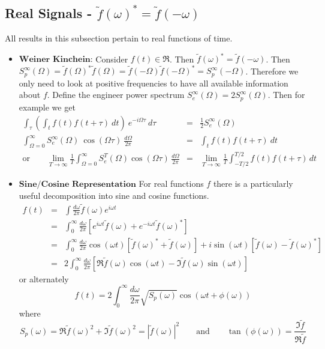 \documentclass{article}
\begin{document}
\subsection*{Real Signals - $\tilde{f}(\omega)^{*}=\tilde{f}(-\omega)$}
All results in this subsection pertain to real functions of time.

\begin{itemize}

\item $\textbf{Weiner Kinchein:}$ Consider $f(t)\in\Re$. Then $\tilde{f}(\omega)^{*}=\tilde{f}(-\omega)$.
Then $S_{p}^{\infty}(\Omega)=\tilde{f}(\Omega)^{*}\tilde{f}(\Omega)=\tilde{f}(-\Omega)\tilde{f}(-\Omega)^{*}=S_{p}^{\infty}(-\Omega)$.
Therefore we only need to look at positive frequencies to have all
available information about $f$. Define the engineer power spectrum
$S_{e}^{\infty}(\Omega)=2S_{p}^{\infty}(\Omega)$. Then for example
we get \begin{eqnarray*}
\int_{\tau}\left(\int_{t}f(t)f(t+\tau)~dt\right)\: e^{-i\Omega\tau}\: d\tau & = & \frac{1}{2}S_{e}^{\infty}(\Omega)\\
\int_{\Omega=0}^{\infty}S_{e}^{\infty}(\Omega)\:\cos(\Omega\tau)\:\frac{d\Omega}{2\pi} & = & \int_{t}f(t)f(t+\tau)\: dt\\
\textrm{or}\qquad\lim_{T\rightarrow\infty}\frac{1}{T}\int_{\Omega=0}^{\infty}S_{e}^{T}(\Omega)\cos(\Omega\tau)\,\frac{d\Omega}{2\pi} & = & \lim_{T\rightarrow\infty}\frac{1}{T}\int_{-T/2}^{T/2}f(t)f(t+\tau)\, dt\end{eqnarray*}

\item $\textbf{Sine/Cosine Representation}$
For real functions $f$ there is a particularly useful decomposition into sine and cosine functions.
\begin{eqnarray*}
f(t) & = & \int\frac{d\omega}{2\pi}\tilde{f}(\omega)e^{i\omega t}\\
 & = & \int_{0}^{\infty}\frac{d\omega}{2\pi}\left[e^{i\omega t}\tilde{f}(\omega)+e^{-i\omega t}\tilde{f}(\omega)^{*}\right]\\
 & = & \int_{0}^{\infty}\frac{d\omega}{2\pi}\cos(\omega t)\left[\tilde{f}(\omega)^{*}+\tilde{f}(\omega)\right]+i\sin(\omega t)\left[\tilde{f}(\omega)-\tilde{f}(\omega)^{*}\right]\\
 & = & 2 \int_{0}^{\infty}\frac{d\omega}{2\pi}\left[\Re\tilde{f}(\omega)\cos(\omega t)-\Im\tilde{f}(\omega)\sin(\omega t)\right]\end{eqnarray*}
 or alternately\[
f(t)= 2 \int_{0}^{\infty}\frac{d\omega}{2\pi}\sqrt{S_{p}(\omega)}\cos\left(\omega t+\phi(\omega)\right)\]
 where\[
S_{p}(\omega)=\Re\tilde{f}(\omega)^{2}+\Im\tilde{f}(\omega)^{2}=|\tilde{f}(\omega)|^{2}\qquad\textrm{and}\qquad\tan\left(\phi(\omega)\right)=\frac{\Im\tilde{f}}{\Re\tilde{f}}\]


\end{itemize}
\end{document}

